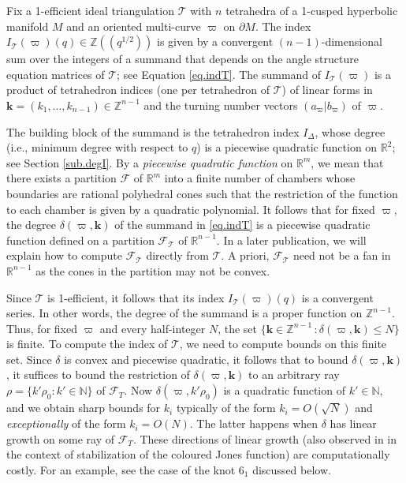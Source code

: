 \documentclass[12pt]{amsart}
\theoremstyle{definition}
\theoremstyle{remark}
\def\R{\mathbb{R}}
\def\kk{\boldsymbol{k}}
\def\BN{\mathbb N}
\def\BZ{\mathbb Z}
\def\BR{\mathbb R}
\def\calF{\mathcal F}
\def\d{\delta}
\newcommand{\CT}{\mathcal{T}}
\def\bd{\partial}
\begin{document}
Fix a 1-efficient ideal triangulation $\CT$ with $n$ tetrahedra of a 1-cusped 
hyperbolic manifold $M$ and an oriented  multi-curve $\varpi$ on $\bd M$.
The index 
$I_{\CT}(\varpi)(q) \in \BZ((q^{1/2}))$ is given by a convergent 
$(n-1)$-dimensional sum over the integers of a summand that
depends on the angle structure equation matrices of $\CT$; see Equation 
\eqref{eq.indT}. The summand of $I_{\CT}(\varpi)$ is a product of tetrahedron 
indices (one per tetrahedron of $\CT$) of linear forms in 
$\kk =(k_1, \ldots, k_{n-1}) \in \BZ^{n-1}$ and the turning number vectors $(a_{\varpi}|b_{\varpi})$ of $\varpi$.

The building block of the summand is the tetrahedron
index $I_\Delta$, whose degree (i.e., minimum degree with respect to $q$)
is a piecewise quadratic function on $\R^2$; see Section \ref{sub.degI}.
By a {\em piecewise quadratic function} on $\BR^m$, we mean that there exists a partition $\calF$
of $\BR^{m}$ into a finite number of chambers whose boundaries are 
rational polyhedral cones such that the restriction of the function to 
each chamber is given by a quadratic polynomial. 
It follows that for fixed $\varpi$, the degree $\d(\varpi,\kk)$ of the summand 
in \eqref{eq.indT} is a piecewise quadratic function defined on a partition 
$\calF_{\CT}$ of $\BR^{n-1}$. In a later publication, we will explain how 
to compute $\calF_{\CT}$ directly from $\CT$. 
A priori, $\calF_{\CT}$ need not be a fan in $\BR^{n-1}$ as the cones in 
the partition may not be convex.

Since $\CT$ is 1-efficient, it follows that its index $I_{\CT}(\varpi)(q)$
is a convergent series. In other words, the degree of the summand is
a proper function on $\BZ^{n-1}$. Thus, for fixed $\varpi$ and 
every half-integer $N$, the set $\{\kk \in \BZ^{n-1} \,: \d(\varpi,\kk) \leq N \}$
is finite. To compute the index of $\CT$, we need 
to compute bounds on this finite set. Since $\d$ is convex and 
piecewise quadratic, it follows that to bound $\d(\varpi,\kk)$, it suffices
to bound the restriction of $\d(\varpi,\kk)$ to an arbitrary ray $\rho = \{ k' \rho_0: k' \in \BN\}$ of $\calF_T$.
Now $\d(\varpi,k' \rho_0)$ is a quadratic function of $k' \in \BN$, and 
we obtain sharp bounds for 
$k_i$ typically of the form $k_i=O(\sqrt{N})$
and {\em exceptionally} of the form $k_i=O(N)$. The latter happens when
$\d$ has linear growth on some ray of $\calF_T$. These directions of 
linear growth (also observed in \cite{GL2} in the context of stabilization
of the coloured Jones function) are computationally costly. For an example,
see the case of the knot $6_1$ discussed below. 
\end{document}
